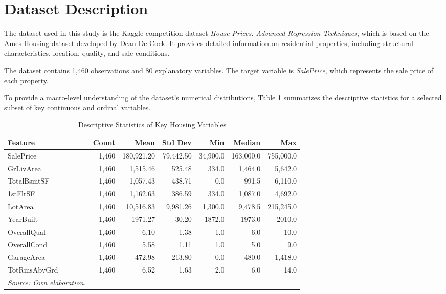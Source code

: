 \documentclass[12pt,a4paper,oneside,openany]{book}
\begin{document}
\section{Dataset Description}

The dataset used in this study is the Kaggle competition dataset \textit{House Prices: Advanced Regression Techniques}, which is based on the Ames Housing dataset developed by Dean De Cock. It provides detailed information on residential properties, including structural characteristics, location, quality, and sale conditions.

The dataset contains 1,460 observations and 80 explanatory variables. The target variable is \textit{SalePrice}, which represents the sale price of each property.

To provide a macro-level understanding of the dataset's numerical distributions, Table \ref{tab:desc_stats} summarizes the descriptive statistics for a selected subset of key continuous and ordinal variables.

\begin{table}[htbp]
\centering
\caption{Descriptive Statistics of Key Housing Variables}
\label{tab:desc_stats}
\begin{tabular}{lrrrrrr}
\toprule
\textbf{Feature} & \textbf{Count} & \textbf{Mean} & \textbf{Std Dev} & \textbf{Min} & \textbf{Median} & \textbf{Max} \\
\midrule
SalePrice & 1,460 & 180,921.20 & 79,442.50 & 34,900.0 & 163,000.0 & 755,000.0 \\
GrLivArea & 1,460 & 1,515.46 & 525.48 & 334.0 & 1,464.0 & 5,642.0 \\
TotalBsmtSF & 1,460 & 1,057.43 & 438.71 & 0.0 & 991.5 & 6,110.0 \\
1stFlrSF & 1,460 & 1,162.63 & 386.59 & 334.0 & 1,087.0 & 4,692.0 \\
LotArea & 1,460 & 10,516.83 & 9,981.26 & 1,300.0 & 9,478.5 & 215,245.0 \\
YearBuilt & 1,460 & 1971.27 & 30.20 & 1872.0 & 1973.0 & 2010.0 \\
OverallQual & 1,460 & 6.10 & 1.38 & 1.0 & 6.0 & 10.0 \\
OverallCond & 1,460 & 5.58 & 1.11 & 1.0 & 5.0 & 9.0 \\
GarageArea & 1,460 & 472.98 & 213.80 & 0.0 & 480.0 & 1,418.0 \\
TotRmsAbvGrd & 1,460 & 6.52 & 1.63 & 2.0 & 6.0 & 14.0 \\
\bottomrule
\textit{Source: Own elaboration.}
\end{tabular}
\end{table}
\end{document}
